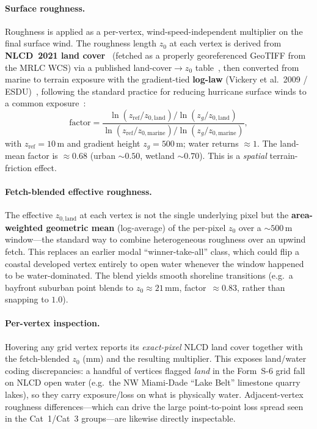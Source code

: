 \documentclass[11pt]{article}
\begin{document}
\paragraph{Surface roughness.}
Roughness is applied as a per-vertex, wind-speed-independent multiplier on the
final surface wind. The roughness length $z_0$ at each vertex is derived from
\textbf{NLCD~2021 land cover}~\cite{nlcd} (fetched as a properly georeferenced GeoTIFF from
the MRLC WCS) via a published land-cover$\to z_0$ table~\cite{aersurface}, then converted from
marine to terrain exposure with the gradient-tied \textbf{log-law}
(Vickery et al.\ 2009 / ESDU)~\cite{vickery,esdu}, following the standard practice for
reducing hurricane surface winds to a common exposure~\cite{powell1996}:
\[
\text{factor}=\frac{\ln(z_{\text{ref}}/z_{0,\text{land}})/\ln(z_g/z_{0,\text{land}})}
{\ln(z_{\text{ref}}/z_{0,\text{marine}})/\ln(z_g/z_{0,\text{marine}})},
\]
with $z_{\text{ref}}=10$\,m and gradient height $z_g=500$\,m; water returns
$\approx1$. The land-mean factor is $\approx0.68$ (urban $\sim0.50$, wetland
$\sim0.70$). This is a \emph{spatial} terrain-friction effect.

\paragraph{Fetch-blended effective roughness.}
The effective $z_{0,\text{land}}$ at each vertex is not the single underlying
pixel but the \textbf{area-weighted geometric mean} (log-average) of the
per-pixel $z_0$ over a $\sim500$\,m window---the standard way to combine
heterogeneous roughness over an upwind fetch. This replaces an earlier
modal ``winner-take-all'' class, which could flip a coastal developed vertex
entirely to open water whenever the window happened to be water-dominated. The
blend yields smooth shoreline transitions (e.g.\ a bayfront suburban point
blends to $z_0\!\approx\!21$\,mm, factor~$\approx\!0.83$, rather than snapping to
$1.0$).

\paragraph{Per-vertex inspection.}
Hovering any grid vertex reports its \emph{exact-pixel} NLCD land cover together
with the fetch-blended $z_0$ (mm) and the resulting multiplier. This exposes
land/water coding discrepancies: a handful of vertices flagged \emph{land} in the
Form~S-6 grid fall on NLCD open water (e.g.\ the NW Miami-Dade ``Lake Belt''
limestone quarry lakes), so they carry exposure/loss on what is physically water.
Adjacent-vertex roughness differences---which can drive the large point-to-point
loss spread seen in the Cat~1/Cat~3 groups---are likewise directly inspectable.
\end{document}
